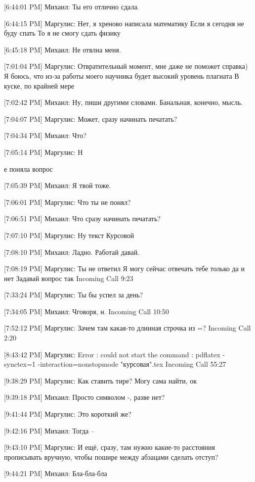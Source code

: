 \documentclass{article}
\newcommand{\yat}{{\fontencoding{X2}\selectfont\cyryat}} %
\begin{document}
[6:44:01 PM] Михаил:
Ты его отлично сдала.

[6:44:15 PM] Маргулис:
Нет, я хреново написала математику
 Если я сегодня не буду спать
 То я не смогу сдать физику

[6:45:18 PM] Михаил:
Не отвл на меня.

[7:01:04 PM] Маргулис:
Отвратительный момент, мне даже не поможет справка)
 Я боюсь, что из-за работы моего научника будет высокий уровень плагиата
 В куске, по крайней мере

[7:02:42 PM] Михаил:
Ну, пиши другими словами.
 Банальная, конечно, мысль.

[7:04:07 PM] Маргулис:
Может, сразу начинать печатать?

[7:04:34 PM] Михаил:
Что?

[7:05:14 PM] Маргулис:
Н
 
 
 
е поняла вопрос

[7:05:39 PM] Михаил:
Я твой тоже.

[7:06:01 PM] Маргулис:
Что ты не понял?

[7:06:51 PM] Михаил:
Что сразу начинать печатать?

[7:07:10 PM] Маргулис:
Ну текст
 Курсовой

[7:08:10 PM] Михаил:
Ладно. Работай давай.

[7:08:19 PM] Маргулис:
Ты не ответил
 Я могу сейчас отвечать тебе только да и нет
 Задавай вопрос так
Incoming Call 9:23

[7:33:24 PM] Маргулис:
Ты бы успел за день?

[7:34:05 PM] Михаил:
Ч говоря, н.
Incoming Call 10:50

[7:52:12 PM] Маргулис:
Зачем там какая-то длинная строчка из =?
Incoming Call 2:20

[8:43:42 PM] Маргулис:
Error : could not start the command : pdflatex -synctex=1 -interaction=nonstopmode "курсовая".tex
Incoming Call 55:27

[9:38:29 PM] Маргулис:
Как ставить тире?
 Могу сама найти, ок

[9:39:18 PM] Михаил:
Просто символом -, разве нет?

[9:41:44 PM] Маргулис:
Это короткий же?

[9:42:16 PM] Михаил:
Тогда --

[9:43:10 PM] Маргулис:
И ещё, сразу, там нужно какие-то расстояния прописывать вручную, чтобы пошире между абзацами сделать отступ?

[9:44:21 PM] Михаил:
Бла-бла-бла
\end{document}
